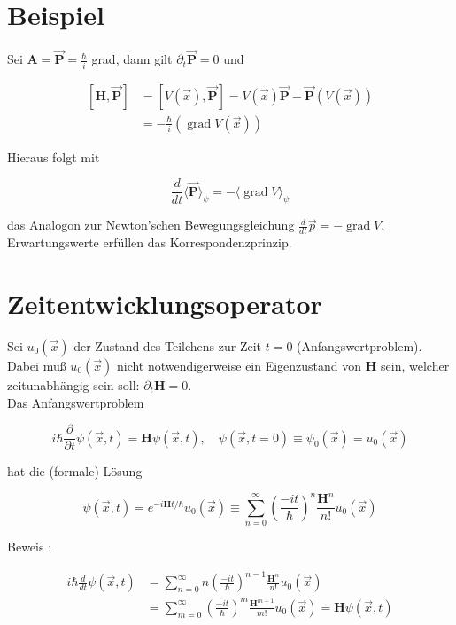 \documentclass[10pt, letterpaper]{article}
\begin{document}
\section*{Beispiel}
Sei $\mathbf{A}=\overrightarrow{\mathbf{P}}=\frac{\hbar}{i}$ grad, dann gilt $\partial_{t} \overrightarrow{\mathbf{P}}=0$ und

$$
\begin{aligned}
{[\mathbf{H}, \overrightarrow{\mathbf{P}}] } & =[V(\vec{x}), \overrightarrow{\mathbf{P}}]=V(\vec{x}) \overrightarrow{\mathbf{P}}-\overrightarrow{\mathbf{P}}(V(\vec{x})) \\
& =-\frac{\hbar}{i}(\operatorname{grad} V(\vec{x}))
\end{aligned}
$$

Hieraus folgt mit

$$
\frac{d}{d t}\langle\overrightarrow{\mathbf{P}}\rangle_{\psi}=-\langle\operatorname{grad} V\rangle_{\psi}
$$

das Analogon zur Newton'schen Bewegungsgleichung $\frac{d}{d t} \vec{p}=-\operatorname{grad} V$.\\
Erwartungswerte erfüllen das Korrespondenzprinzip.

\section*{Zeitentwicklungsoperator}
Sei $u_{0}(\vec{x})$ der Zustand des Teilchens zur Zeit $t=0$ (Anfangswertproblem). Dabei muß $u_{0}(\vec{x})$ nicht notwendigerweise ein Eigenzustand von $\mathbf{H}$ sein, welcher zeitunabhängig sein soll: $\partial_{t} \mathbf{H}=0$.\\
Das Anfangswertproblem

$$
i \hbar \frac{\partial}{\partial t} \psi(\vec{x}, t)=\mathbf{H} \psi(\vec{x}, t), \quad \psi(\vec{x}, t=0) \equiv \psi_{0}(\vec{x})=u_{0}(\vec{x})
$$

hat die (formale) Lösung

$$
\psi(\vec{x}, t)=e^{-i \mathbf{H} t / \hbar} u_{0}(\vec{x}) \equiv \sum_{n=0}^{\infty}\left(\frac{-i t}{\hbar}\right)^{n} \frac{\mathbf{H}^{n}}{n!} u_{0}(\vec{x})
$$

Beweis :

$$
\begin{aligned}
i \hbar \frac{d}{d t} \psi(\vec{x}, t) & =\sum_{n=0}^{\infty} n\left(\frac{-i t}{\hbar}\right)^{n-1} \frac{\mathbf{H}^{n}}{n!} u_{0}(\vec{x}) \\
& =\sum_{m=0}^{\infty}\left(\frac{-i t}{\hbar}\right)^{m} \frac{\mathbf{H}^{m+1}}{m!} u_{0}(\vec{x})=\mathbf{H} \psi(\vec{x}, t)
\end{aligned}
$$
\end{document}
